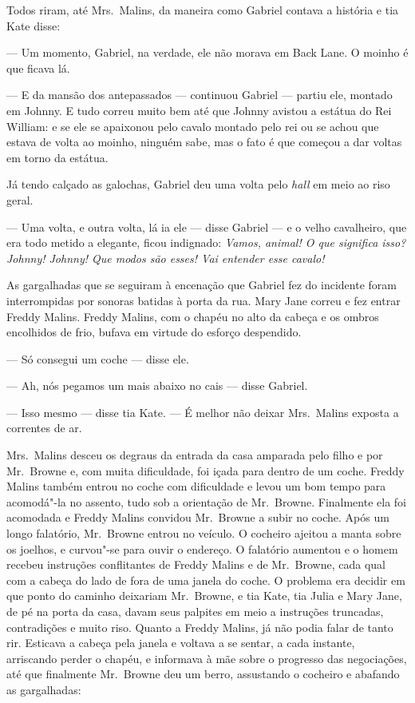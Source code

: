 Todos riram, até Mrs.~Malins, da maneira como Gabriel contava a história e tia
Kate disse:

--- Um momento, Gabriel, na verdade, ele não morava em Back Lane.  O moinho é
que ficava lá.

--- E da mansão dos antepassados --- continuou Gabriel --- partiu ele, montado
em Johnny.  E tudo correu muito bem até que Johnny avistou a estátua do Rei
William: e se ele se apaixonou pelo cavalo montado pelo rei ou se achou que
estava de volta ao moinho, ninguém sabe, mas o fato é que começou a dar voltas
em torno da estátua.

Já tendo calçado as galochas, Gabriel deu uma volta pelo \textit{hall} em meio
ao riso geral.

--- Uma volta, e outra volta, lá ia ele --- disse Gabriel --- e o velho
cavalheiro, que era todo metido a elegante, ficou indignado: \textit{Vamos,
animal!  O que significa isso?  Johnny! Johnny!  Que modos são esses!  Vai entender esse cavalo!}

As gargalhadas que se seguiram à encenação que Gabriel fez do incidente foram
interrompidas por sonoras batidas à porta da rua.  Mary Jane correu e fez
entrar Freddy Malins.  Freddy Malins, com o chapéu no alto da cabeça e os
ombros encolhidos de frio, bufava em virtude do esforço despendido.

--- Só consegui um coche --- disse ele.

--- Ah, nós pegamos um mais abaixo no cais --- disse Gabriel.

--- Isso mesmo --- disse tia Kate.  --- É melhor não deixar Mrs.~Malins exposta
a correntes de ar.

Mrs.~Malins desceu os degraus da entrada da casa amparada pelo filho e por 
Mr.~Browne e, com muita dificuldade, foi içada para dentro de um coche.  Freddy
Malins também entrou no coche com dificuldade e levou um bom tempo para
acomodá"-la no assento, tudo sob a orientação de Mr.~Browne.  Finalmente ela
foi acomodada e Freddy Malins convidou Mr.~Browne a subir no coche.  Após um
longo falatório, Mr.~Browne entrou no veículo.  O cocheiro ajeitou a manta
sobre os joelhos, e curvou"-se para ouvir o endereço.  O falatório aumentou e o
homem recebeu instruções conflitantes de Freddy Malins e de Mr.~Browne, cada
qual com a cabeça do lado de fora de uma janela do coche.  O problema era
decidir em que ponto do caminho deixariam Mr.~Browne, e tia Kate, tia Julia e
Mary Jane, de pé na porta da casa, davam seus palpites em meio a instruções
truncadas, contradições e muito riso.  Quanto a Freddy Malins, já não podia
falar de tanto rir.  Esticava a cabeça pela janela e voltava a se sentar, a
cada instante, arriscando perder o chapéu, e informava à mãe sobre o progresso
das negociações, até que finalmente Mr.~Browne deu um berro, assustando o
cocheiro e abafando as gargalhadas:


